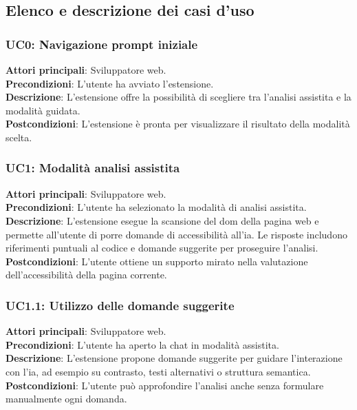 \subsection{Elenco e descrizione dei casi d'uso}
\subsubsection*{UC0: Navigazione prompt iniziale}
\noindent \textbf{Attori principali}: Sviluppatore web.\\
\textbf{Precondizioni}: L'utente ha avviato l’estensione.\\
\textbf{Descrizione}: L’estensione offre la possibilità di scegliere tra l’analisi assistita e la modalità guidata.\\
\textbf{Postcondizioni}: L’estensione è pronta per visualizzare il risultato della modalità scelta.\\

\subsubsection*{UC1: Modalità analisi assistita}
\noindent \textbf{Attori principali}: Sviluppatore web.\\
\textbf{Precondizioni}: L’utente ha selezionato la modalità di analisi assistita.\\
\textbf{Descrizione}: L’estensione esegue la scansione del \acrshort{dom} della pagina web e permette all’utente di porre domande di accessibilità all’\acrshort{ia}. Le risposte includono riferimenti puntuali al codice e domande suggerite per proseguire l’analisi.\\
\textbf{Postcondizioni}: L’utente ottiene un supporto mirato nella valutazione dell’accessibilità della pagina corrente.\\

\subsubsection*{UC1.1: Utilizzo delle domande suggerite}
\noindent \textbf{Attori principali}: Sviluppatore web.\\
\textbf{Precondizioni}: L’utente ha aperto la chat in modalità assistita.\\
\textbf{Descrizione}: L’estensione propone domande suggerite per guidare l’interazione con l’\acrshort{ia}, ad esempio su contrasto, testi alternativi o struttura semantica.\\
\textbf{Postcondizioni}: L’utente può approfondire l’analisi anche senza formulare manualmente ogni domanda.\\

